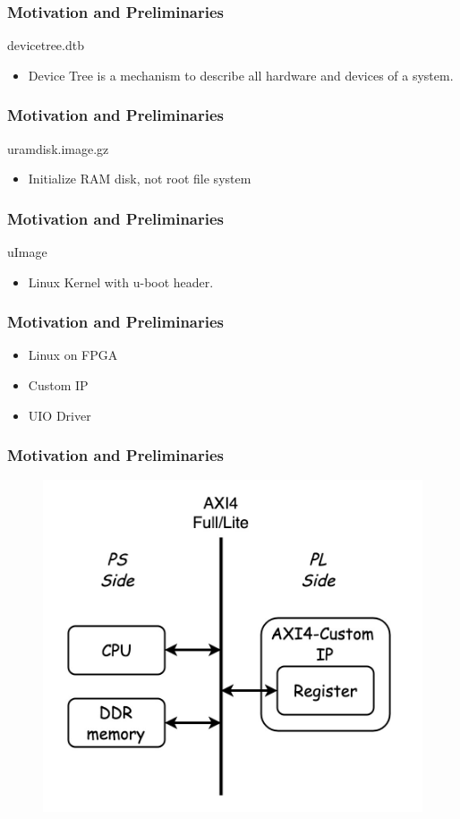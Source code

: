 \documentclass{beamer}
\begin{document}
\begin{frame}
\frametitle{\textcolor[rgb]{0.5,0.5,0.3}{Motivation} and Preliminaries}
devicetree.dtb
\begin{itemize}
	\item Device Tree is a mechanism to describe all hardware and devices of a system.
\end{itemize}
\end{frame}

\begin{frame}
\frametitle{\textcolor[rgb]{0.5,0.5,0.3}{Motivation} and Preliminaries}
uramdisk.image.gz
\begin{itemize}
	\item Initialize RAM disk, not root file system
\end{itemize}
\end{frame}

\begin{frame}
\frametitle{\textcolor[rgb]{0.5,0.5,0.3}{Motivation} and Preliminaries}
uImage
\begin{itemize}
	\item Linux Kernel with u-boot header.
\end{itemize}
\end{frame}

\begin{frame}
\frametitle{\textcolor[rgb]{0.5,0.5,0.3}{Motivation} and Preliminaries}
\begin{itemize}
\item Linux on FPGA
\item \alert{Custom IP}
\item UIO Driver
\end{itemize}
\end{frame}

\begin{frame}
\frametitle{\textcolor[rgb]{0.5,0.5,0.3}{Motivation} and Preliminaries}
\begin{figure}
\centering\includegraphics[scale=0.25]{image/customAXI4IP.jpg}
\end{figure}
\end{frame}
\end{document}
